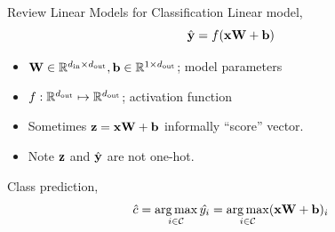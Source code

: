 \documentclass{beamer}
\begin{document}
\begin{frame}{Review Linear Models for Classification}
  Linear model,
  \[\hat{\mathbf{y}} = f(\mathbf{x} \mathbf{W} + \mathbf{b})\]
  \begin{itemize}
  \item $\mathbf{W} \in \mathbb{R}^{{d_{\mathrm{in}}} \times {d_{\mathrm{out}}}}, \mathbf{b} \in \mathbb{R}^{1 \times {d_{\mathrm{out}}}}$; model parameters
  \item $f: \mathbb{R}^{{d_{\mathrm{out}}}} \mapsto \mathbb{R}^{{d_{\mathrm{out}}}}$; activation function
  \item Sometimes $\mathbf{z} = \mathbf{x} \mathbf{W} + \mathbf{b}$ informally ``score'' vector.
  \item Note $\mathbf{z}$ and $\hat{\mathbf{y}}$ are not one-hot.
  \end{itemize}

  \air

  Class prediction,
  \[ \hat{c} = \argmax_{i \in \mcC} \hat{y_i}  = \argmax_{i \in \mcC} (\boldx \boldW + \boldb)_i    \]
\end{frame}
\end{document}
